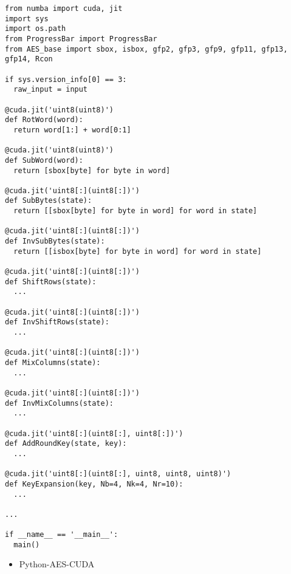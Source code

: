 \begin{lstlisting}
from numba import cuda, jit
import sys
import os.path
from ProgressBar import ProgressBar
from AES_base import sbox, isbox, gfp2, gfp3, gfp9, gfp11, gfp13, gfp14, Rcon

if sys.version_info[0] == 3:
  raw_input = input

@cuda.jit('uint8(uint8)')
def RotWord(word):
  return word[1:] + word[0:1]

@cuda.jit('uint8(uint8)')
def SubWord(word):
  return [sbox[byte] for byte in word]

@cuda.jit('uint8[:](uint8[:])')
def SubBytes(state):
  return [[sbox[byte] for byte in word] for word in state]

@cuda.jit('uint8[:](uint8[:])')
def InvSubBytes(state):
  return [[isbox[byte] for byte in word] for word in state]

@cuda.jit('uint8[:](uint8[:])')
def ShiftRows(state):
  ...

@cuda.jit('uint8[:](uint8[:])')
def InvShiftRows(state):
  ...

@cuda.jit('uint8[:](uint8[:])')
def MixColumns(state):
  ...

@cuda.jit('uint8[:](uint8[:])')
def InvMixColumns(state):
  ...

@cuda.jit('uint8[:](uint8[:], uint8[:])')
def AddRoundKey(state, key):
  ...

@cuda.jit('uint8[:](uint8[:], uint8, uint8, uint8)')
def KeyExpansion(key, Nb=4, Nk=4, Nr=10):
  ...

...

if __name__ == '__main__':
  main()
\end{lstlisting}

\begin{itemize}
  \item Python-AES-CUDA
\end{itemize}